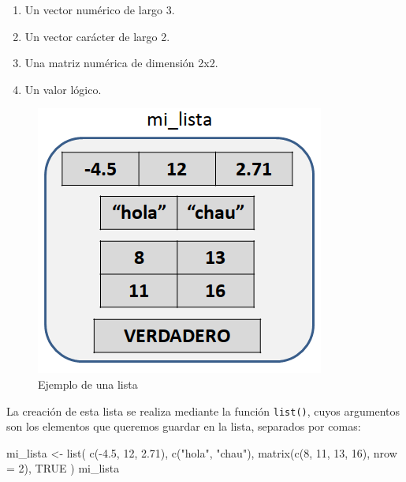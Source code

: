 \documentclass[
]{book}
\newenvironment{Shaded}{\begin{snugshade}}{\end{snugshade}}
\newcommand{\AttributeTok}[1]{\textcolor[rgb]{0.77,0.63,0.00}{#1}}
\newcommand{\ConstantTok}[1]{\textcolor[rgb]{0.00,0.00,0.00}{#1}}
\newcommand{\DecValTok}[1]{\textcolor[rgb]{0.00,0.00,0.81}{#1}}
\newcommand{\FloatTok}[1]{\textcolor[rgb]{0.00,0.00,0.81}{#1}}
\newcommand{\FunctionTok}[1]{\textcolor[rgb]{0.00,0.00,0.00}{#1}}
\newcommand{\NormalTok}[1]{#1}
\newcommand{\OtherTok}[1]{\textcolor[rgb]{0.56,0.35,0.01}{#1}}
\newcommand{\SpecialCharTok}[1]{\textcolor[rgb]{0.00,0.00,0.00}{#1}}
\newcommand{\StringTok}[1]{\textcolor[rgb]{0.31,0.60,0.02}{#1}}
\providecommand{\tightlist}{%
  \setlength{\itemsep}{0pt}\setlength{\parskip}{0pt}}
\begin{document}
\begin{enumerate}
\def\labelenumi{\arabic{enumi}.}
\tightlist
\item
  Un vector numérico de largo 3.
\item
  Un vector carácter de largo 2.
\item
  Una matriz numérica de dimensión 2x2.
\item
  Un valor lógico.
\end{enumerate}

\begin{figure}

{\centering \includegraphics[width=0.5\linewidth]{images/05_estructuras/estr09} 

}

\caption{Ejemplo de una lista}\label{fig:unnamed-chunk-180}
\end{figure}

La creación de esta lista se realiza mediante la función \texttt{list()}, cuyos argumentos son los elementos que queremos guardar en la lista, separados por comas:

\begin{Shaded}
\begin{Highlighting}[]
\NormalTok{mi\_lista }\OtherTok{\textless{}{-}} \FunctionTok{list}\NormalTok{(}
    \FunctionTok{c}\NormalTok{(}\SpecialCharTok{{-}}\FloatTok{4.5}\NormalTok{, }\DecValTok{12}\NormalTok{, }\FloatTok{2.71}\NormalTok{),}
    \FunctionTok{c}\NormalTok{(}\StringTok{"hola"}\NormalTok{, }\StringTok{"chau"}\NormalTok{),}
    \FunctionTok{matrix}\NormalTok{(}\FunctionTok{c}\NormalTok{(}\DecValTok{8}\NormalTok{, }\DecValTok{11}\NormalTok{, }\DecValTok{13}\NormalTok{, }\DecValTok{16}\NormalTok{), }\AttributeTok{nrow =} \DecValTok{2}\NormalTok{),}
    \ConstantTok{TRUE}
\NormalTok{)}
\NormalTok{mi\_lista}
\end{Highlighting}
\end{Shaded}
\end{document}
